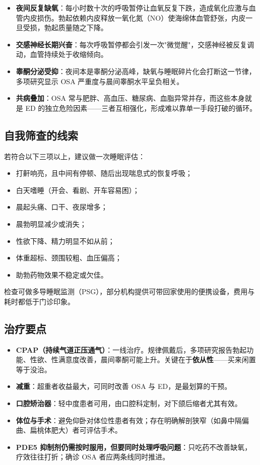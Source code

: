 \documentclass[12pt,a4paper,twoside]{ctexbook}
\begin{document}
\begin{itemize}
	\item \textbf{夜间反复缺氧}：每小时数十次的呼吸暂停让血氧反复下跌，造成氧化应激与血管内皮损伤。勃起依赖内皮释放一氧化氮（NO）使海绵体血管舒张，内皮一旦受损，勃起质量随之下降。
	\item \textbf{交感神经长期兴奋}：每次呼吸暂停都会引发一次"微觉醒"，交感神经被反复调动，血管持续处于收缩倾向。
	\item \textbf{睾酮分泌受抑}：夜间本是睾酮分泌高峰，缺氧与睡眠碎片化会打断这一节律，多项研究显示 OSA 严重度与晨间睾酮水平呈负相关。
	\item \textbf{共病叠加}：OSA 常与肥胖、高血压、糖尿病、血脂异常并存，而这些本身就是 ED 的独立危险因素——三者互相强化，形成难以靠单一手段打破的循环。
\end{itemize}

\subsection{自我筛查的线索}

若符合以下三项以上，建议做一次睡眠评估：

\begin{itemize}
	\item 打鼾响亮，且中间有停顿、随后出现喘息式的恢复呼吸；
	\item 白天嗜睡（开会、看剧、开车容易困）；
	\item 晨起头痛、口干、夜尿增多；
	\item 晨勃明显减少或消失；
	\item 性欲下降、精力明显不如从前；
	\item 体重超标、颈围较粗、血压偏高；
	\item 助勃药物效果不稳定或欠佳。
\end{itemize}

\noindent 检查可做多导睡眠监测（PSG），部分机构提供可带回家使用的便携设备，费用与耗时都低于门诊印象。

\subsection{治疗要点}

\begin{itemize}
	\item \textbf{CPAP（持续气道正压通气）}：一线治疗。规律佩戴后，多项研究报告勃起功能、性欲、性满意度改善，晨间睾酮可能上升。关键在于\textbf{依从性}——买来闲置等于没治。
	\item \textbf{减重}：超重者收益最大，可同时改善 OSA 与 ED，是最划算的干预。
	\item \textbf{口腔矫治器}：轻中度患者可用，由口腔科定制，对下颌后缩者尤其有效。
	\item \textbf{体位与手术}：避免仰卧对体位性患者有效；存在明确解剖狭窄（如鼻中隔偏曲、扁桃体肥大）者可评估手术。
	\item \textbf{PDE5 抑制剂仍需按时服用，但要同时处理呼吸问题}：只吃药不改善缺氧，疗效往往打折；确诊 OSA 者应两条线同时推进。
\end{itemize}
\end{document}
